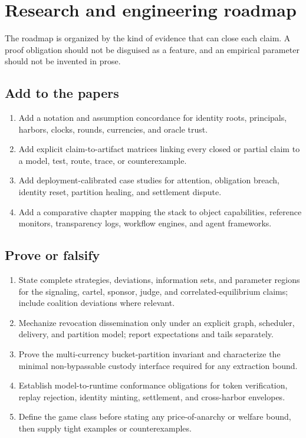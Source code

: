 \section{Research and engineering roadmap}\label{app:volume-roadmap}
The roadmap is organized by the kind of evidence that can close each claim. A
proof obligation should not be disguised as a feature, and an empirical
parameter should not be invented in prose.

\subsection{Add to the papers}
\begin{enumerate}[leftmargin=*]
\item Add a notation and assumption concordance for identity roots, principals,
harbors, clocks, rounds, currencies, and oracle trust.
\item Add explicit claim-to-artifact matrices linking every closed or partial
claim to a model, test, route, trace, or counterexample.
\item Add deployment-calibrated case studies for attention, obligation breach,
identity reset, partition healing, and settlement dispute.
\item Add a comparative chapter mapping the stack to object capabilities,
reference monitors, transparency logs, workflow engines, and agent frameworks.
\end{enumerate}

\subsection{Prove or falsify}
\begin{enumerate}[leftmargin=*]
\item State complete strategies, deviations, information sets, and parameter
regions for the signaling, cartel, sponsor, judge, and correlated-equilibrium
claims; include coalition deviations where relevant.
\item Mechanize revocation dissemination only under an explicit graph, scheduler,
delivery, and partition model; report expectations and tails separately.
\item Prove the multi-currency bucket-partition invariant and characterize the
minimal non-bypassable custody interface required for any extraction bound.
\item Establish model-to-runtime conformance obligations for token verification,
replay rejection, identity minting, settlement, and cross-harbor envelopes.
\item Define the game class before stating any price-of-anarchy or welfare bound,
then supply tight examples or counterexamples.
\end{enumerate}

